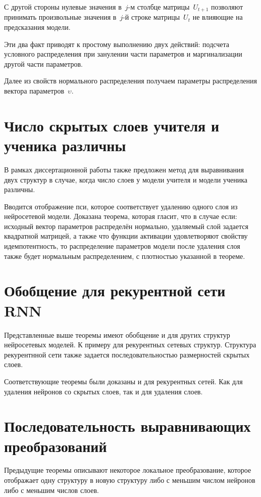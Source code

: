 \documentclass[10pt, twoside]{article}
\begin{document}
С другой стороны нулевые значения в~$j$-м столбце матрицы~$U_{t+1}$ позволяют принимать произвольные значения в~$j$-й строке матрицы~$U_{t}$ не влияющие на предсказания модели.

Эти два факт приводят к простому выполнению двух действий: подсчета условного распределения при занулении части параметров и маргинализации другой части параметров.

Далее из свойств нормального распределения получаем параметры распределения вектора параметров~$\upsilon$.

\section{Число скрытых слоев учителя и ученика различны}

В рамках диссертационной работы также предложен метод для выравнивания двух структур в случае, когда число слоев у модели учителя и модели ученика различны.

Вводится отображение пси, которое соответствует удалению одного слоя из нейросетевой модели.
Доказана теорема, которая гласит, что в случае если: исходный вектор параметров распределён нормально, удаляемый слой задается квадратной матрицей, а также что функции активации удовлетворяют свойству идемпотентность, то распределение параметров модели после удаления слоя также будет нормальным распределением, с плотностью указанной в теореме.

\section{Обобщение для рекурентной сети RNN}

Представленные выше теоремы имеют обобщение и для других структур нейросетевых моделей. К примеру для рекурентных сетевых структур. Структура рекурентнной сети также задается последовательностью размерностей скрытых слоев.

Соответствующие теоремы были доказаны и для рекурентных сетей. Как для удаления нейронов со скрытых слоев, так и для удаления слоев.

\section{Последовательность выравнивающих преобразований}

Предыдущие теоремы описывают некоторое локальное преобразование, которое отображает одну структуру в новую структуру либо с меньшим числом нейронов либо с меньшим числов слоев.
\end{document}
